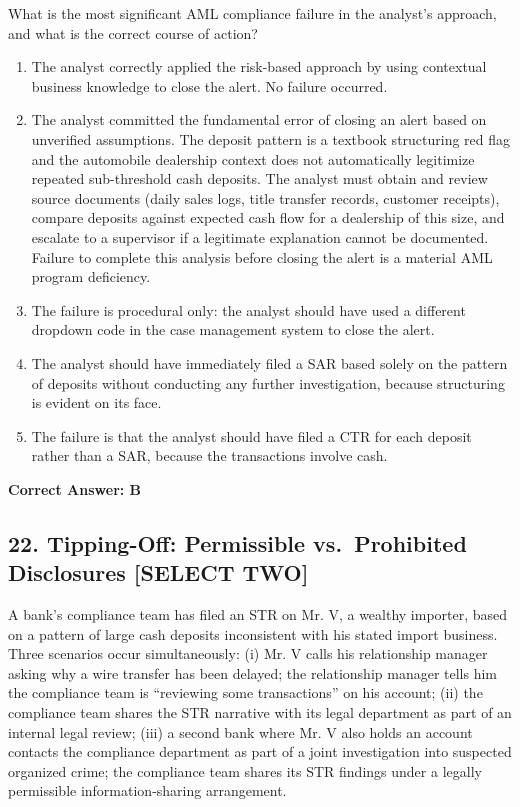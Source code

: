 \documentclass[11pt,a4paper]{article}
\begin{document}
	What is the most significant AML compliance failure in the analyst's approach, and what is the correct course of action?
	
	\begin{enumerate}[label=\Alph*.]
		\item The analyst correctly applied the risk-based approach by using contextual business knowledge to close the alert. No failure occurred.
		\item The analyst committed the fundamental error of closing an alert based on unverified assumptions. The deposit pattern is a textbook structuring red flag and the automobile dealership context does not automatically legitimize repeated sub-threshold cash deposits. The analyst must obtain and review source documents (daily sales logs, title transfer records, customer receipts), compare deposits against expected cash flow for a dealership of this size, and escalate to a supervisor if a legitimate explanation cannot be documented. Failure to complete this analysis before closing the alert is a material AML program deficiency.
		\item The failure is procedural only: the analyst should have used a different dropdown code in the case management system to close the alert.
		\item The analyst should have immediately filed a SAR based solely on the pattern of deposits without conducting any further investigation, because structuring is evident on its face.
		\item The failure is that the analyst should have filed a CTR for each deposit rather than a SAR, because the transactions involve cash.
	\end{enumerate}
	\textbf{Correct Answer: B}
	
	\subsection{22. Tipping-Off: Permissible vs.\ Prohibited Disclosures \textnormal{[SELECT TWO]}}
	
	A bank's compliance team has filed an STR on Mr. V, a wealthy importer, based on a pattern of large cash deposits inconsistent with his stated import business. Three scenarios occur simultaneously: (i) Mr. V calls his relationship manager asking why a wire transfer has been delayed; the relationship manager tells him the compliance team is ``reviewing some transactions'' on his account; (ii) the compliance team shares the STR narrative with its legal department as part of an internal legal review; (iii) a second bank where Mr. V also holds an account contacts the compliance department as part of a joint investigation into suspected organized crime; the compliance team shares its STR findings under a legally permissible information-sharing arrangement.
	
\end{document}

